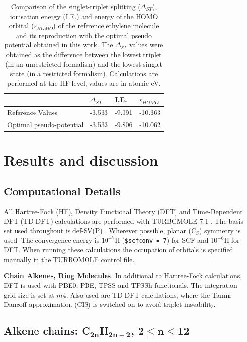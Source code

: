 \documentclass[aip]{revtex4-1}
\begin{document}
\begin{table}[ht]
\begin{tabular}{llll}
\hline\hline
& $\Delta_{ST}$  & I.E.  & $\varepsilon_{HOMO}$  \\
\hline
Reference Values & -3.533 & -9.091 & -10.363 \\
Optimal pseudo-potential & -3.533 & -9.806 & -10.062 \\
\hline\hline
\end{tabular}
\caption{\label{tab:res_ourPP}Comparison of the
singlet-triplet splitting ($\Delta_{ST}$), ionisation
energy (I.E.) and energy of the HOMO orbital ($\varepsilon_{HOMO}$)
of the reference ethylene molecule
and its reproduction with the optimal pseudo potential obtained in this work.
The $\Delta_{ST}$ values were obtained as the difference
between the lowest triplet (in an unrestricted formalism) and the lowest singlet state
(in a restricted formalism).
Calculations are performed at the HF level, values are in atomic eV.}
\end{table}

\section{Results and discussion}

\subsection{Computational Details}

All Hartree-Fock (HF), Density Functional Theory (DFT) and Time-Dependent DFT (TD-DFT) calculations
are performed with TURBOMOLE 7.1 \cite{TURBOMOLE}.
The basis set used throughout is def-SV(P) \cite{defsvp}.
Wherever possible, planar (C\(_{S}\)) symmetry is used.
The convergence energy is \(10^{-7}\)H (\texttt{\$scfconv = 7}) for SCF and \(10^{-6}\)H for DFT.
When running these calculations the occupation of orbitals is specified manually in the TURBOMOLE control file.

\textbf{Chain Alkenes, Ring Molecules}. In additional to Hartree-Fock calculations, DFT is used with PBE0, PBE, TPSS and TPSSh functionals. \cite{pbe0,pbe,tpss,tpssh} The integration grid size is set at \(m4\). Also used are TD-DFT calculations, where the Tamm-Dancoff approximation (CIS) \cite{tammdancoff} is switched on to avoid triplet instability.

\subsection{Alkene chains: C\(\mathbf{_{2n}}\)H\(\mathbf{_{2n+2}}\), \(\mathbf{2 \leq n \leq 12}\)}
\end{document}
